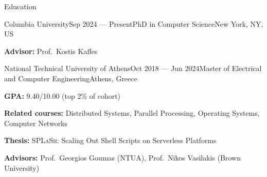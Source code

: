 \documentclass[letterpaper, 12pt]{resume}
\begin{document}

\begin{rSection}{Education}
    \begin{rSubsection}{Columbia University}{Sep 2024 --- Present}{PhD in Computer Science}{New York, NY, US}
        \item \textbf{Advisor:} Prof.\ Kostis Kaffes
    \end{rSubsection}

    \begin{rSubsection}{National Technical University of Athens}{Oct 2018 --- Jun 2024}{Master of Electrical and Computer Engineering}{Athens, Greece}
        \item \textbf{GPA:} 9.40/10.00 (top 2\% of cohort)
        \item \textbf{Related courses:} Distributed Systems, Parallel Processing, Operating Systems, Computer Networks
        \item \textbf{Thesis:} \textsc{SPLaSh}: Scaling Out Shell Scripts on Serverless Platforms
        \item \textbf{Advisors:} Prof.\ Georgios Goumas (NTUA), Prof.\ Nikos Vasilakis (Brown University)
    \end{rSubsection}
\end{rSection}
\end{document}
